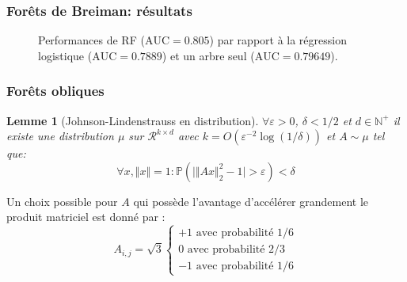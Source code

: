 \documentclass[dvipsnames,10pt]{beamer}
\theoremstyle{plain}
\newtheorem{lemme}{Lemme}
\theoremstyle{definition}
\begin{document}
\begin{frame}
\frametitle{Forêts de Breiman: résultats}
\begin{figure}[H]
\centering
    \caption{Performances de RF ($\mathrm{AUC} = 0.805$) par rapport à la régression logistique ($\mathrm{AUC} = 0.7889$) et un arbre seul ($\mathrm{AUC} = 0.79649$).}
\end{figure}
\end{frame}

\begin{frame}
\frametitle{Forêts obliques}
\begin{lemme}[Johnson-Lindenstrauss en distribution]
    $\forall \varepsilon > 0$, $\delta < 1/2$ et $d \in \mathbb{N}^+$ il existe une distribution $\mu$ sur $\mathcal{R}^{k \times d}$ avec $k = O( \varepsilon^{-2} \log ( 1 / \delta) )$ et $A \sim \mu$ tel que:
    \begin{equation*}
        \forall x , \Vert x \Vert = 1 : \mathbb{P} \left( \vert \Vert A x \Vert^2_2 - 1 \vert > \varepsilon \right) < \delta
    \end{equation*}
\end{lemme}
Un choix possible pour $A$ qui possède l'avantage d'accélérer grandement le produit matriciel est donné par \citet{Achlioptas2003}:
\begin{equation*}
    A_{i,j} = \sqrt{3} \begin{cases}
        +1 \text{ avec probabilité } 1/6 \\
        0 \text{ avec probabilité } 2/3 \\
        -1 \text{ avec probabilité } 1/6
    \end{cases}
\end{equation*}
\end{frame}
\end{document}

